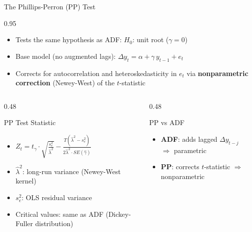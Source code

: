 \documentclass[9pt, aspectratio=169, t]{beamer}
\begin{document}
\begin{frame}{The Phillips-Perron (PP) Test}
    \begin{cminipage}{0.95\textwidth}
        \small
        \begin{defn}
            \begin{itemize}\setlength{\itemsep}{0pt}
                \item Tests the same hypothesis as ADF: $H_0$: unit root ($\gamma = 0$)
                \item Base model (no augmented lags): $\Delta y_t = \alpha + \gamma\, y_{t-1} + e_t$
                \item Corrects for autocorrelation and heteroskedasticity in $e_t$ via \textbf{nonparametric correction} (Newey-West) of the $t$-statistic
            \end{itemize}
        \end{defn}
        \vspace{-0.2cm}
        \begin{columns}[T]
            \begin{column}{0.48\textwidth}
                \begin{block}{PP Test Statistic}
                    \begin{itemize}\setlength{\itemsep}{0pt}
                        \item $Z_t = t_\gamma \cdot \sqrt{\frac{s_e^2}{\hat{\lambda}^2}} - \frac{T(\hat{\lambda}^2 - s_e^2)}{2\hat{\lambda}^2 \cdot SE(\hat{\gamma})}$
                        \item $\hat{\lambda}^2$: long-run variance (Newey-West kernel)
                        \item $s_e^2$: OLS residual variance
                        \item Critical values: same as ADF (Dickey-Fuller distribution)
                    \end{itemize}
                \end{block}
            \end{column}
            \begin{column}{0.48\textwidth}
                \begin{exampleblock}{PP vs ADF}
                    \begin{itemize}\setlength{\itemsep}{0pt}
                        \item \textbf{ADF}: adds lagged $\Delta y_{t-j}$ $\Rightarrow$ parametric
                        \item \textbf{PP}: corrects $t$-statistic $\Rightarrow$ nonparametric

\end{itemize}
\end{exampleblock}
\end{column}
\end{columns}
\end{cminipage}
\end{frame}
\end{document}
